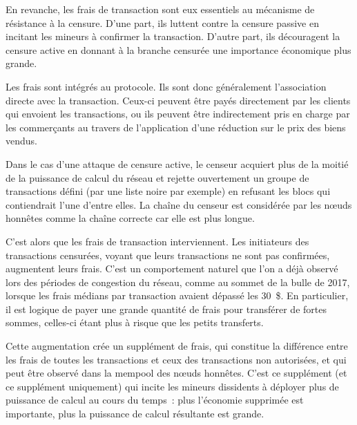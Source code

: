 En revanche, les frais de transaction sont eux essentiels au mécanisme de résistance à la censure. D'une part, ils luttent contre la censure passive en incitant les mineurs à confirmer la transaction. D'autre part, ils découragent la censure active en donnant à la branche censurée une importance économique plus grande.

Les frais sont intégrés au protocole. Ils sont donc généralement l'association directe avec la transaction. Ceux-ci peuvent être payés directement par les clients qui envoient les transactions, ou ils peuvent être indirectement pris en charge par les commerçants au travers de l'application d'une réduction sur le prix des biens vendus.

Dans le cas d'une attaque de censure active, le censeur acquiert plus de la moitié de la puissance de calcul du réseau et rejette ouvertement un groupe de transactions défini (par une liste noire par exemple) en refusant les blocs qui contiendrait l'une d'entre elles. La chaîne du censeur est considérée par les nœuds honnêtes comme la chaîne correcte car elle est plus longue.

C'est alors que les frais de transaction interviennent. Les initiateurs des transactions censurées, voyant que leurs transactions ne sont pas confirmées, augmentent leurs frais. C'est un comportement naturel que l'on a déjà observé lors des périodes de congestion du réseau, comme au sommet de la bulle de 2017, lorsque les frais médians par transaction avaient dépassé les 30~\$. En particulier, il est logique de payer une grande quantité de frais pour transférer de fortes sommes, celles-ci étant plus à risque que les petits transferts.

Cette augmentation crée un supplément de frais, qui constitue la différence entre les frais de toutes les transactions et ceux des transactions non autorisées, et qui peut être observé dans la mempool des nœuds honnêtes. C'est ce supplément (et ce supplément uniquement) qui incite les mineurs dissidents à déployer plus de puissance de calcul au cours du temps~: plus l'économie supprimée est importante, plus la puissance de calcul résultante est grande.

